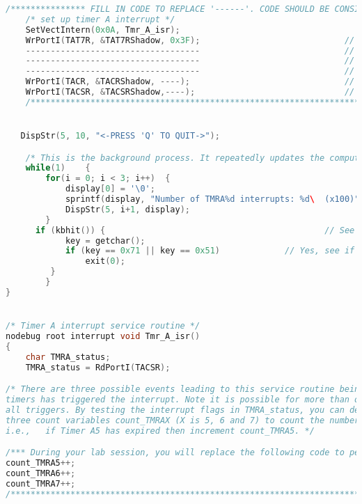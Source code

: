 \begin{lstlisting}[language=C++]
	/*************** FILL IN CODE TO REPLACE '------'. CODE SHOULD BE CONSISTENT WITH COMMENTS. REFER TO FIGURE 5. IN LAB MANUAL. *******************/
	/* set up timer A interrupt */
	SetVectIntern(0x0A, Tmr_A_isr); 									// set up timer A interrupt vector
	WrPortI(TAT7R, &TAT7RShadow, 0x3F);								// set TMRA7 to count down from 63
  	-----------------------------------								// set TMRA6 to count down from 127
	-----------------------------------								// set TMRA5 to count down from 255
	-----------------------------------								// set TMRA1 to count down from 255
	WrPortI(TACR, &TACRShadow, ----);								// Clock TMRA5,TMRA6,TMRA7 by TMRA1. Clock TMRA4 by PCLK/2. Set Timer A to trigger priority 1 interrupts
	WrPortI(TACSR, &TACSRShadow,----); 								// Enable interrupts for TMRA5,TMRA6,TMRA7 only. Enable main clock for Timer A
	/************************************************************************************************************************************************/


   DispStr(5, 10, "<-PRESS 'Q' TO QUIT->");

	/* This is the background process. It repeatedly updates the computer monitor with the values in the display_count array */
	while(1)	{
		for(i = 0; i < 3; i++)	{
			display[0] = '\0';
			sprintf(display, "Number of TMRA%d interrupts: %d\  (x100)",i+5, display_count[i]);
			DispStr(5, i+1, display);
		}
      if (kbhit()) {											// See if key has been pressed
			key = getchar();
			if (key == 0x71 || key == 0x51)				// Yes, see if it's the q or Q key
				exit(0);
         }
 		}
}


/* Timer A interrupt service routine */
nodebug root interrupt void Tmr_A_isr()
{
	char TMRA_status;														// This will hold the interrupt flags
	TMRA_status = RdPortI(TACSR);										// Read interrupt flags and store to TMRA_status

/* There are three possible events leading to this service routine being called. Write code to determine which of the three
timers has triggered the interrupt. Note it is possible for more than one timer to expire at the same time, thus your code must service
all triggers. By testing the interrupt flags in TMRA_status, you can determine which counters have expired. Use
three count variables count_TMRAX (X is 5, 6 and 7) to count the number of interrupts. For each Timer AX interrupt you must increment the corresponding count variable.
i.e.,	if Timer A5 has expired then increment count_TMRA5. */

/*** During your lab session, you will replace the following code to perform as specified above ***/
count_TMRA5++;
count_TMRA6++;
count_TMRA7++;
/**************************************************************************************************/



\end{lstlisting}
